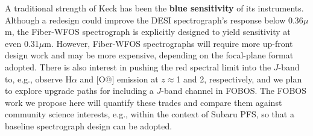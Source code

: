 \documentclass[11pt,letterpaper]{article}
\makeatletter
\newcommand\micron{\mbox{$\mu$m}}%
\newcommand*{\rom}[1]{\expandafter\@slowromancap\romannumeral #1@}
\makeatother
\begin{document}


  A traditional strength of Keck has been
the {\bf blue sensitivity} of its instruments.  Although a redesign
could improve the DESI spectrograph's response below 0.36\micron, the
Fiber-WFOS spectrograph is explicitly designed to yield sensitivity at
even 0.31\micron. 
However, Fiber-WFOS spectrographs will require more up-front design work
and may be more expensive, depending on the focal-plane format adopted.
There is also interest in pushing the red spectral limit into the
$J$-band to, e.g., observe H$\alpha$ and [O{\small \rom{2}}] emission at
$z$$\approx$1 and 2, respectively, and we plan to explore upgrade paths
for including a $J$-band channel in FOBOS.  The FOBOS work we propose
here will quantify these trades and compare them against community
science interests, e.g., within the context of Subaru PFS, so that a
baseline spectrograph design can be adopted.
\end{document}
